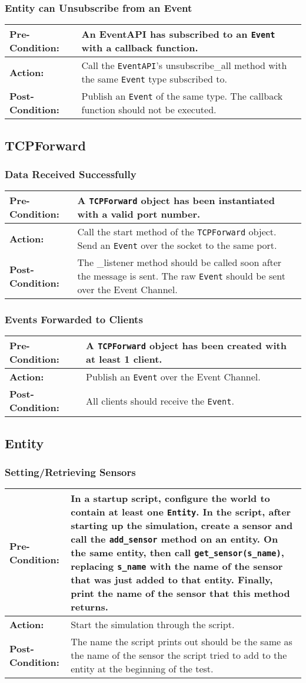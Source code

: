 \documentclass[titlepage]{article}
\newcommand{\testcase}[3]{
    \begin{center}
    \begin{tabular}{| l | p{0.7\textwidth}|}
        \hline
        \rowcolor[gray]{0.8}\textbf{Pre-Condition:} & #1 \\ \hline
        \textbf{Action:} & #2 \\ \hline
        \rowcolor[gray]{0.8}\textbf{Post-Condition:} & #3 \\ \hline
    \end{tabular}
    \end{center}
}
\begin{document}
\subsubsection{Entity can Unsubscribe from an Event}
\testcase{An EventAPI has subscribed to an \texttt{Event} with a callback function.}{Call the \texttt{EventAPI}'s unsubscribe\_all method with the same \texttt{Event} type subscribed to.}{Publish an \texttt{Event} of the same type. The callback function should not be executed.}

\subsection{TCPForward}
\subsubsection{Data Received Successfully}
\testcase{A \texttt{TCPForward} object has been instantiated with a valid port number.}{Call the start method of the
\texttt{TCPForward} object. Send an \texttt{Event} over the socket to the same port. }{The \_listener method should be called soon
after the message is sent. The raw \texttt{Event} should be sent over the Event Channel. }

\subsubsection{Events Forwarded to Clients}
\testcase{A \texttt{TCPForward} object has been created with at least 1 client.}{Publish an \texttt{Event} over the
Event Channel.}{All clients should receive the \texttt{Event}.}

\subsection{Entity}
\subsubsection{Setting/Retrieving Sensors}
\testcase{In a startup script, configure the world to contain at least one \texttt{Entity}. In the script, after starting up the simulation, create a sensor and call the \texttt{add\_sensor} method on an entity.  On the same entity, then call \texttt{get\_sensor(s\_name)}, replacing \texttt{s\_name} with the name of the sensor that was just added to that entity.  Finally, print the name of the sensor that this method returns.}{Start the simulation through the script.}{The name the script prints out should be the same as the name of the sensor the script tried to add to the entity at the beginning of the test.}
\end{document}
